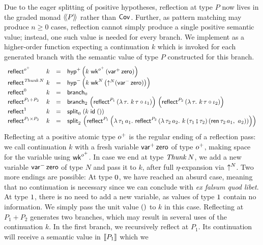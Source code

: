 \documentclass[sigplan,screen]{acmart}
\begin{document}
Due to the eager splitting of positive hypotheses, reflection at type $P$
now lives in the graded monad $\langle\!\langle P \rangle\!\rangle$ rather than $\mathsf{Cov}^{}$.  Further,
as pattern matching may produce $n \geq 0$ cases, reflection cannot simply
produce a single positive semantic value; instead, one such value is needed
for every branch.  We implement
as a higher-order function expecting a continuation $k$ which is
invoked for each generated branch with the semantic value of type $P$
constructed for this branch.
\[
\begin{array}{l@{~}lcl}
  \reflect {\patom} & k & = &
    \phyp \left( k\;\twk^{\patom}\,(\pvar\,\tzero) \right) \\
  \reflect {\Thunk N} & k & = &
    \nhyp \left( k\;\twk^N \left( \up N (\nvar\,\tzero) \right) \right)\\
  \reflect {\tyzero} & k & = & \nbranch \\
  \reflect {P_1 + P_2} & k & = & \bbranch
    \,\left( \treflect^{P_1}\,(\lambda\,\tau. \ k\,\tau \comp \iota_1) \right)
    \,\left( \treflect^{P_2}\,(\lambda\,\tau. \ k\,\tau \comp \iota_2) \right)
    \\
  \reflect{\tyone} & k & = & \nsplit\;(k\;\tid\;\ttempty) \\
  \reflect{P_1 \times P_2} & k & = & \bsplit
    \,\left(
      \treflect^{P_1} \left( \lambda\,\tau_1\,a_1. \
      \treflect^{P_2} \left( \lambda\,\tau_2\,a_2. \
        k\, (\tau_1 \rcomp \tau_2)\, (\tren\,\tau_2\,a_1, \ a_2)
        \right)
      \right)
    \right)
\end{array}
\]
Reflecting at a positive atomic type $o^+$ is the regular ending of a
reflection pass: we call continuation $k$ with a fresh variable
$\mathsf{var}^{+}\,\mathsf{zero}$ of type $o^+$, making space for the variable
using $\mathsf{wk}^{o^+}$.
In case we end at type $\mathit{Thunk}\,N$, we add a new variable
$\mathsf{var}^{-}\,\mathsf{zero}$ of type $N$ and pass it to $k$, after full
$\eta$-expansion via $\mathord{\uparrow_{}^{N}}$.  Two more endings are possible:
At type
$0$, we have reached an absurd case, meaning that no
continuation is necessary since we can conclude with
\emph{ex falsum quod libet}.
At type $1$, there is no need to add a new variable, as values
of type $1$ contain no information.  We simply pass the unit
value $()$ to $k$ in this case.
Reflecting at $P_1 + P_2$ generates two branches, which may result in
several uses of the continuation $k$.
In the first branch, we recursively reflect at $P_1$.  Its
continuation will receive a semantic value in $\mathopen{{[\kern-0.14em[}} P_1 \mathclose{{]\kern-0.14em]}}$ which we
\end{document}
